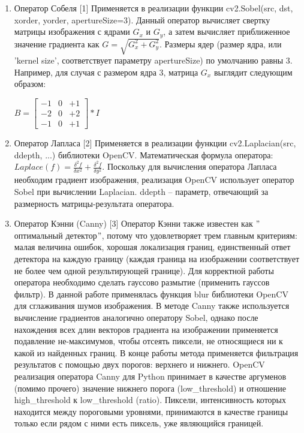 \begin{enumerate}
	\item Оператор Собеля [1]
	\newline
	Применяется в реализации функции cv2.Sobel(src, dst, xorder, yorder, apertureSize=3). Данный оператор вычисляет свертку матрицы изображения с ядрами $G_x$ и $G_y$, а затем вычисляет приближенное значение градиента как $G = \sqrt{G^{2}_x + G^{2}_y}$. Размеры ядер (размер ядра, или 'kernel size', соответствует параметру apertureSize) по умолчанию равны 3.
	\newline Например, для случая с размером ядра 3, матрица $G_x$ выглядит следующим образом: 
	\newline
\begin{center}
		$B = 
	\begin{bmatrix}
		-1 & 0 & +1 \\
		-2 & 0 & +2 \\
		-1 & 0 & +1
	\end{bmatrix} * I$
\end{center}
	\item Оператор Лапласа [2]
	\newline
	Применяется в реализации функции cv2.Laplacian(src, ddepth, ...) библиотеки OpenCV. Математическая формула оператора: $Laplace(f) = \frac{\delta^{2}f}{\delta x^{2}} + \frac{\delta^{2}f}{\delta y^{2}}$.
	\newline
	Поскольку для вычисления оператора Лапласа необходим градиент изображения, реализация OpenCV использует оператор Sobel при вычислении Laplacian. ddepth -- параметр, отвечающий за размерность матрицы-результата оператора.

	\item Оператор Кэнни (Canny) [3]	
	\newline
	Оператор Кэнни также известен как $"$оптимальный детектор$"$, потому что удовлетворяет трем главным критериям: малая величина ошибок, хорошая локализация границ, единственный ответ детектора на каждую границу (каждая граница на изображении соответствует не более чем одной результирующей границе).  
	\newline 
	Для корректной работы оператора необходимо сделать гауссово размытие (применить гауссов фильтр). В данной работе применялась функция blur библиотеки OpenCV для сглаживания шумов изображения.
	\newline
	В методе Canny также используется вычисление градиентов аналогично оператору Sobel, однако после нахождения всех длин векторов градиента на изображении применяется подавление не-максимумов, чтобы отсеять пиксели, не относящиеся ни к какой из найденных границ.
	\newline
	В конце работы метода применяется фильтрация результатов с помощью двух порогов: верхнего и нижнего. OpenCV реализация оператора Canny для Python принимает в качестве аргуменов (помимо прочего) значение нижнего порога (low\_threshold) и отношение high\_threshold к low\_threshold (ratio). Пиксели, интенсивность которых находится между пороговыми уровнями, принимаются в качестве границы только если рядом с ними есть пиксель, уже являющийся границей.
	\newline 
\end{enumerate}


